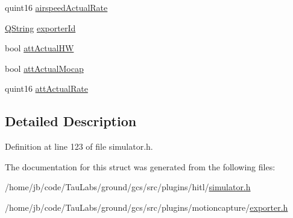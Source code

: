 \begin{DoxyCompactItemize}
\item 
quint16 \hyperlink{group___h_i_t_l_plugin_gacb3c852192e75845b2a17679c94a10c1}{airspeed\-Actual\-Rate}
\item 
\hyperlink{group___u_a_v_objects_plugin_gab9d252f49c333c94a72f97ce3105a32d}{\-Q\-String} \hyperlink{group___mo_cap_plugin_ga2bff4ba6b082ec966a7075df9e19d66b}{exporter\-Id}
\item 
bool \hyperlink{group___mo_cap_plugin_ga4d9a7f3563731377f2905f1b18e17d52}{att\-Actual\-H\-W}
\item 
bool \hyperlink{group___mo_cap_plugin_gacd70b3a85672be0f8311fc107768c93f}{att\-Actual\-Mocap}
\item 
quint16 \hyperlink{group___mo_cap_plugin_ga14fb71ed2eb43b817ee157f6cdcb84eb}{att\-Actual\-Rate}
\end{DoxyCompactItemize}


\subsection{\-Detailed \-Description}


\-Definition at line 123 of file simulator.\-h.



\-The documentation for this struct was generated from the following files\-:\begin{DoxyCompactItemize}
\item 
/home/jb/code/\-Tau\-Labs/ground/gcs/src/plugins/hitl/\hyperlink{simulator_8h}{simulator.\-h}\item 
/home/jb/code/\-Tau\-Labs/ground/gcs/src/plugins/motioncapture/\hyperlink{exporter_8h}{exporter.\-h}\end{DoxyCompactItemize}
